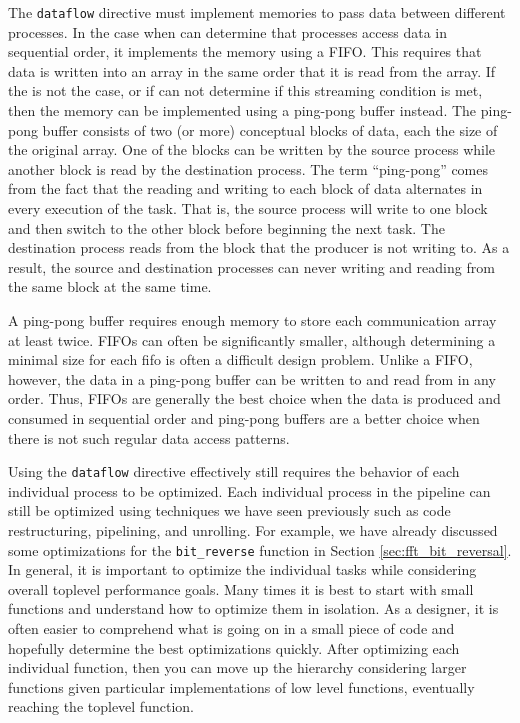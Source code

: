 The \lstinline{dataflow} directive must implement memories to pass data between different processes. In the case when \VHLS can determine that processes access data in sequential order, it implements the memory using a FIFO. This requires that data is written into an array in the same order that it is read from the array.  If the is not the case, or if \VHLS can not determine if this streaming condition is met, then the memory can be implemented using a ping-pong buffer instead.   The ping-pong buffer consists of two (or more) conceptual blocks of data, each the size of the original array. One of the blocks can be written by the source process while another block is read by the destination process. The term ``ping-pong'' comes from the fact that the reading and writing to each block of data alternates in every execution of the task. That is, the source process will write to one block and then switch to the other block before beginning the next task. The destination process reads from the block that the producer is not writing to. As a result, the source and destination processes can never writing and reading from the same block at the same time. 

A ping-pong buffer requires enough memory to store each communication array at least twice.   FIFOs can often be significantly smaller, although determining a minimal size for each fifo is often a difficult design problem.  Unlike a FIFO, however, the data in a ping-pong buffer can be written to and read from in any order. Thus, FIFOs are generally the best choice when the data is produced and consumed in sequential order and ping-pong buffers are a better choice when there is not such regular data access patterns.

Using the \lstinline{dataflow} directive effectively still requires the behavior of each individual process to be optimized. Each individual process in the pipeline can still be optimized using techniques we have seen previously such as code restructuring, pipelining, and unrolling.  For example, we have already discussed some optimizations for the \lstinline{bit_reverse} function in Section \ref{sec:fft_bit_reversal}.  In general, it is important to optimize the individual tasks while considering overall toplevel performance goals. Many times it is best to start with small functions and understand how to optimize them in isolation. As a designer, it is often easier to comprehend what is going on in a small piece of code and hopefully determine the best optimizations quickly. After optimizing each individual function, then you can move up the hierarchy considering larger functions given particular implementations of low level functions, eventually reaching the toplevel function.

